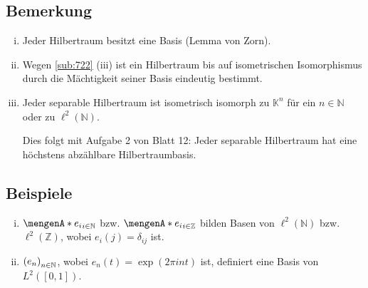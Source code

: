 \subsection[Bemerkungen zu Hilbertraumbasen und Mächtigkeit deren Mächtigkeit]{Bemerkung} %
\label{sub:723}
\begin{enumerate}[(i)]
	\item Jeder Hilbertraum besitzt eine Basis (Lemma von Zorn).
	\item Wegen \ref{sub:722} (iii) ist ein Hilbertraum bis auf isometrischen Isomorphismus durch die Mächtigkeit seiner Basis eindeutig bestimmt.
	\item Jeder separable Hilbertraum ist isometrisch isomorph zu $\mathds{K}^n$ für ein $n \in \mathds{N}$ oder zu $\ell^2(\mathds{N})$.
	
	Dies folgt mit Aufgabe 2 von Blatt 12: Jeder separable Hilbertraum hat eine höchstens abzählbare Hilbertraumbasis. 
\end{enumerate}

\subsection[Beispiele für Basen von Hilberträumen]{Beispiele} %
\label{sub:724}
\begin{enumerate}[(i)]
	\item $\set{e_i}_{i \in \mathds{N}}$ bzw. $\set{e_i}_{i \in \mathds{Z}}$ bilden Basen von $\ell^2(\mathds{N})$ bzw. $\ell^2(\mathds{Z})$, wobei 
	$e_i(j)= \delta_{ij}$ ist.
	\item $\enbrace*{e_n}_{n \in \mathds{N}}$, wobei $e_n(t)=\exp(2 \pi i n t)$ ist, definiert eine Basis von $L^2([0,1])$.
\end{enumerate}

